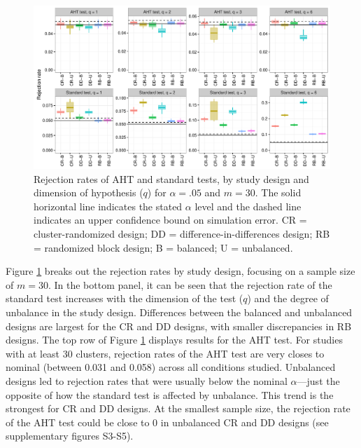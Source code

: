 \documentclass[12pt]{article}\usepackage[]{graphicx}\usepackage[]{color}
\newenvironment{knitrout}{}{} %
\begin{document}
\begin{knitrout}
\color{fgcolor}\begin{figure}

{\centering \includegraphics[width=\linewidth]{CR_fig/balance-1} 

}

\caption[Rejection rates of AHT and standard tests, by study design and dimension of hypothesis (]{Rejection rates of AHT and standard tests, by study design and dimension of hypothesis ($q$) for $\alpha = .05$ and $m = 30$. The solid horizontal line indicates the stated $\alpha$ level and the dashed line indicates an upper confidence bound on simulation error. CR = cluster-randomized design; DD = difference-in-differences design; RB = randomized block design; B = balanced; U = unbalanced.}\label{fig:balance}
\end{figure}


\end{knitrout}

Figure \ref{fig:balance} breaks out the rejection rates by study design, focusing on a sample size of $m = 30$. 
In the bottom panel, it can be seen that the rejection rate of the standard test increases with the dimension of the test ($q$) and the degree of unbalance in the study design.
Differences between the balanced and unbalanced designs are largest for the CR and DD designs, with smaller discrepancies in RB designs.
The top row of Figure \ref{fig:balance} displays results for the AHT test.
For studies with at least 30 clusters, rejection rates of the AHT test are very closes to nominal (between 0.031 and 0.058) across all conditions studied.
Unbalanced designs led to rejection rates that were usually below the nominal $\alpha$---just the opposite of how the standard test is affected by unbalance. 
This trend is the strongest for CR and DD designs. At the smallest sample size, the rejection rate of the AHT test could be close to 0 in unbalanced CR and DD designs (see supplementary figures S3-S5). 
\end{document}
